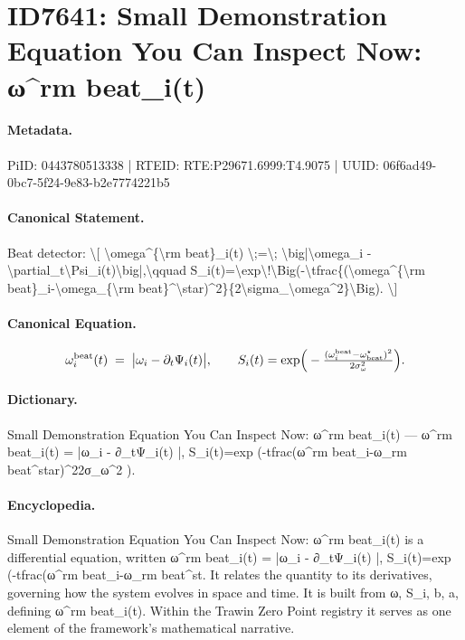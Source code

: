 \section*{ID7641: Small Demonstration Equation You Can Inspect Now: ω\textasciicircum{}rm beat\_i(t)}
\paragraph{Metadata.}
PiID: 0443780513338 | RTEID: RTE:P29671.6999:T4.9075 | UUID: 06f6ad49-0bc7-5f24-9e83-b2e7774221b5

\paragraph{Canonical Statement.}
Beat detector: \textbackslash{}[ \textbackslash{}omega\textasciicircum{}\{\textbackslash{}rm beat\}\_i(t) \textbackslash{};=\textbackslash{}; \textbackslash{}big|\textbackslash{}omega\_i - \textbackslash{}partial\_t\textbackslash{}Psi\_i(t)\textbackslash{}big|,\textbackslash{}qquad S\_i(t)=\textbackslash{}exp\textbackslash{}!\textbackslash{}Big(-\textbackslash{}tfrac\{(\textbackslash{}omega\textasciicircum{}\{\textbackslash{}rm beat\}\_i-\textbackslash{}omega\_\{\textbackslash{}rm beat\}\textasciicircum{}\textbackslash{}star)\textasciicircum{}2\}\{2\textbackslash{}sigma\_\textbackslash{}omega\textasciicircum{}2\}\textbackslash{}Big). \textbackslash{}]

\paragraph{Canonical Equation.}
\[
\omega^{\rm beat}_i(t) \;=\; \big|\omega_i - \partial_t\Psi_i(t)\big|,\qquad S_i(t)=\exp\!\Big(-\tfrac{(\omega^{\rm beat}_i-\omega_{\rm beat}^\star)^2}{2\sigma_\omega^2}\Big).
\]

\paragraph{Dictionary.}
Small Demonstration Equation You Can Inspect Now: ω\textasciicircum{}rm beat\_i(t) — ω\textasciicircum{}rm beat\_i(t) = |ω\_i - ∂\_tΨ\_i(t) |, S\_i(t)=exp (-tfrac(ω\textasciicircum{}rm beat\_i-ω\_rm beat\textasciicircum{}star)\textasciicircum{}22σ\_ω\textasciicircum{}2 ).

\paragraph{Encyclopedia.}
Small Demonstration Equation You Can Inspect Now: ω\textasciicircum{}rm beat\_i(t) is a differential equation, written ω\textasciicircum{}rm beat\_i(t) = |ω\_i - ∂\_tΨ\_i(t) |, S\_i(t)=exp (-tfrac(ω\textasciicircum{}rm beat\_i-ω\_rm beat\textasciicircum{}st. It relates the quantity to its derivatives, governing how the system evolves in space and time. It is built from ω, S\_i, b, a, defining ω\textasciicircum{}rm beat\_i(t). Within the Trawin Zero Point registry it serves as one element of the framework's mathematical narrative.
